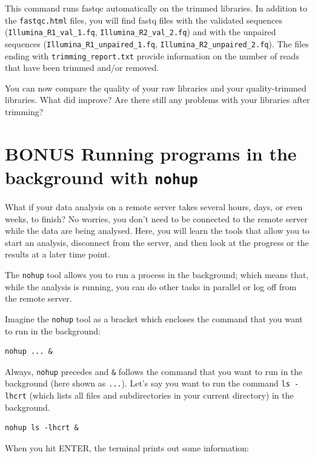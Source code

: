 \documentclass[11pt]{article}
\begin{document}
This command runs fastqc automatically on the trimmed libraries. In addition
to the \texttt{fastqc.html} files, you will find fastq files with the validated
sequences (\texttt{Illumina\_R1\_val\_1.fq}, \texttt{Illumina\_R2\_val\_2.fq}) and with the
unpaired sequences (\texttt{Illumina\_R1\_unpaired\_1.fq}, \texttt{Illumina\_R2\_unpaired\_2.fq}).
The files ending with \texttt{trimming\_report.txt} provide information on the number
of reads that have been trimmed and/or removed.

You can now compare the quality of your raw libraries and your
quality-trimmed libraries. What did improve? Are there still any
problems with your libraries after trimming?

\section{BONUS Running programs in the background with \texttt{nohup}}
\label{sec:orgheadline8}
What if your data analysis on a remote server takes several hours,
days, or even weeks, to finish? No worries, you don't need to be
connected to the remote server while the data are being
analysed. Here, you will learn the tools that allow you to start
an analysis, disconnect from the server, and then look at the progress
or the results at a later time point.

The \texttt{nohup} tool allows you to run a process in the background; which
means that, while the analysis is running, you can do other tasks in
parallel or log off from the remote server.

Imagine the \texttt{nohup} tool as a bracket which encloses the command that
you want to run in the background:

\begin{verbatim}
nohup ... &
\end{verbatim}

Always, \texttt{nohup} precedes and \texttt{\&} follows the command that you want to
run in the background (here shown as \texttt{...}). Let's say you want to run
the command \texttt{ls -lhcrt} (which lists all files and subdirectories in
your current directory) in the background.

\begin{verbatim}
nohup ls -lhcrt &
\end{verbatim}

When you hit ENTER, the terminal prints out some information:
\end{document}

